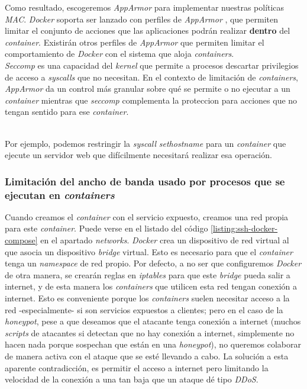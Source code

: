 Como resultado, escogeremos \emph{AppArmor} \cite{wiki-apparmor} para implementar nuestras políticas \emph{MAC}. \emph{Docker} soporta ser lanzado con perfiles de \emph{AppArmor} \cite{docker-doc-apparmor}, que permiten
limitar el conjunto de acciones que las aplicaciones podrán realizar \textbf{dentro} del \emph{container}. Existirán otros perfiles de \emph{AppArmor} que permiten limitar el comportamiento
de \emph{Docker} con el sistema que aloja \emph{containers}.
\ \\
\emph{Seccomp} \cite{wiki-seccomp} es una capacidad del \emph{kernel} que permite a procesos descartar privilegios de acceso a \emph{syscalls} 
que no necesitan. En el contexto de limitación de \emph{containers}, \emph{AppArmor} da un control más granular sobre qué se permite 
o no ejecutar a un \emph{container} mientras que \emph{seccomp} complementa 
la proteccion para acciones que no tengan sentido para ese \emph{container}.

\ \\
Por ejemplo, podemos restringir la \emph{syscall} \emph{sethostname} para un \emph{container} 
que ejecute un servidor web que difícilmente necesitará realizar esa operación.

\subsubsection{Limitación del ancho de banda usado por procesos que se ejecutan en \emph{containers}}

Cuando creamos el \emph{container} con el servicio expuesto, creamos una red propia para este \emph{container}. Puede verse
en el listado del código \ref{listing:ssh-docker-compose} en el apartado \emph{networks}.
\emph{Docker} crea un dispositivo de red virtual al que asocia un dispositivo \emph{bridge} virtual. Esto es necesario para que el 
\emph{container} tenga un \emph{namespace} \cite{wiki-namespaces} de red propio. Por defecto, a no ser que configuremos \emph{Docker}
de otra manera, se crearán reglas en \emph{iptables} para que este \emph{bridge} pueda salir a internet, y de esta manera los 
\emph{containers} que utilicen esta red tengan conexión a internet.
Esto es conveniente porque los \emph{containers} suelen necesitar acceso a la red -especialmente- si son servicios expuestos a clientes; pero en el caso de la \emph{honeypot}, pese a que deseamos que el atacante tenga
conexión a internet (muchos \emph{scripts} de atacantes si detectan que no hay conexión a internet, simplemente no hacen nada porque sospechan que 
están en una \emph{honeypot}), no queremos colaborar de manera activa con el ataque que se esté llevando a cabo.
La solución a esta aparente contradicción, es permitir el acceso a internet pero limitando la velocidad de la conexión a una tan baja que un ataque
dé tipo \emph{DDoS}.

